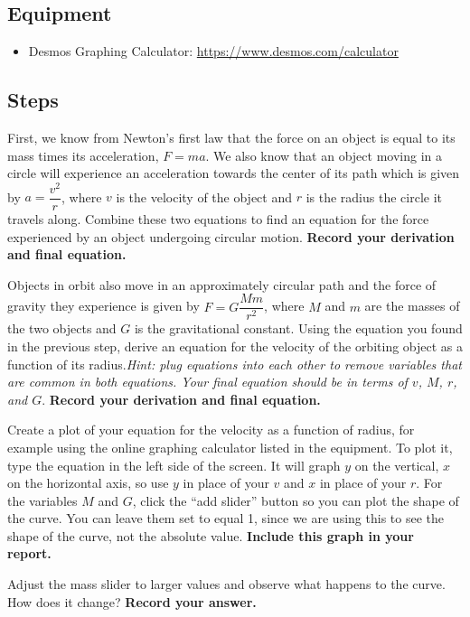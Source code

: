 \subsection{Equipment}

\begin{itemize}
	\item Desmos Graphing Calculator: \url{https://www.desmos.com/calculator}
\end{itemize}

\subsection{Steps}

\begin{steps}
	\item First, we know from Newton's first law that the force on an object is equal to its mass times its acceleration, $F=ma$. We also know that an object moving in a circle will experience an acceleration towards the center of its path which is given by $a = \dfrac{v^2}{r}$, where $v$ is the velocity of the object and $r$ is the radius the circle it travels along. Combine these two equations to find an equation for the force experienced by an object undergoing circular motion. \textbf{Record your derivation and final equation.}
	
	\item Objects in orbit also move in an approximately circular path and the force of gravity they experience is given by $F = G\dfrac{Mm}{r^2}$, where $M$ and $m$ are the masses of the two objects and $G$ is the gravitational constant. Using the equation you found in the previous step, derive an equation for the velocity of the orbiting object as a function of its radius.\textit{Hint: plug equations into each other to remove variables that are common in both equations. Your final equation should be in terms of $v$, $M$, $r$, and $G$}. \textbf{Record your derivation and final equation.}
	
	\item Create a plot of your equation for the velocity as a function of radius, for example using the online graphing calculator listed in the equipment. To plot it, type the equation in the left side of the screen. It will graph $y$ on the vertical, $x$ on the horizontal axis, so use $y$ in place of your $v$ and $x$ in place of your $r$. For the variables $M$ and $G$, click the ``add slider'' button so you can plot the shape of the curve. You can leave them set to equal 1, since we are using this to see the shape of the curve, not the absolute value. \textbf{Include this graph in your report.}
	
	\item Adjust the mass slider to larger values and observe what happens to the curve. How does it change? \textbf{Record your answer.}
\end{steps}

